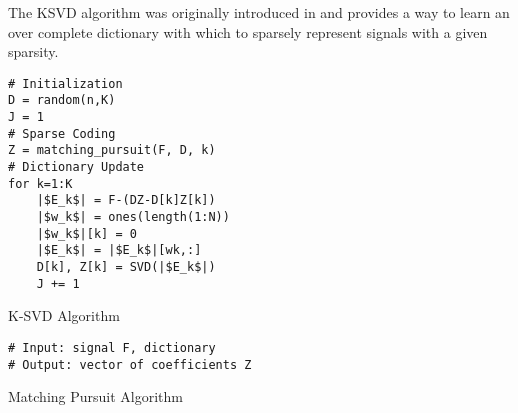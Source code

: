 The \ac{KSVD} algorithm was originally introduced in \cite{aharon_k-svd_2005} and provides a way to learn an over complete dictionary with which to sparsely represent signals with a given sparsity.

\begin{listing}
\begin{verbatim}
# Initialization
D = random(n,K)
J = 1
# Sparse Coding
Z = matching_pursuit(F, D, k)
# Dictionary Update
for k=1:K
	|$E_k$| = F-(DZ-D[k]Z[k])
	|$w_k$| = ones(length(1:N))
	|$w_k$|[k] = 0
	|$E_k$| = |$E_k$|[wk,:]
	D[k], Z[k] = SVD(|$E_k$|)
	J += 1
\end{verbatim}
\label{code:ksvd}
\caption{K-SVD Algorithm \cite{aharon_k-svd_2005}}
\end{listing}

\begin{listing}
\begin{verbatim}
# Input: signal F, dictionary 
# Output: vector of coefficients Z
\end{verbatim}
\caption{Matching Pursuit Algorithm \cite{mallat_matching_1993-2}}
\end{listing}
